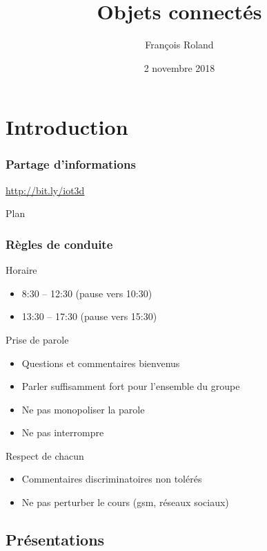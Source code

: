 \documentclass[aspectratio=169,utf8,french]{beamer}
\title{Objets connectés}
\author{François Roland}
\date{2 novembre 2018}
\begin{document}
\frame{\titlepage}

\section{Introduction}

\begin{frame}
  \frametitle{Partage d'informations}
  \begin{center}
    \url{http://bit.ly/iot3d}
  \end{center}
\end{frame}

\begin{frame}{Plan}
  \tableofcontents
\end{frame}

\begin{frame}
  \frametitle{Règles de conduite}
  Horaire
  \begin{itemize}
    \item 8:30 -- 12:30 (pause vers 10:30)
    \item 13:30 -- 17:30 (pause vers 15:30)
  \end{itemize}
  Prise de parole
  \begin{itemize}
    \item Questions et commentaires bienvenus 
    \item Parler suffisamment fort pour l'ensemble du groupe
    \item Ne pas monopoliser la parole
    \item Ne pas interrompre
  \end{itemize}
  Respect de chacun
  \begin{itemize}
    \item Commentaires discriminatoires non tolérés
    \item Ne pas perturber le cours (gsm, réseaux sociaux)
  \end{itemize}
\end{frame}

\subsection{Présentations}
\end{document}
